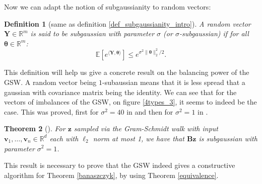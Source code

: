 \documentclass[12pt]{article}
\newtheorem{theorem}{Theorem}
\newtheorem{definition}[theorem]{Definition}
\begin{document}
Now we can adapt the notion of subgaussianity to random vectors:
\begin{definition}[same as definition \ref{def_subgaussianity_intro}]
A random vector $\textbf{Y} \in \mathbb{R}^m$ is said to be subgaussian with parameter $\sigma$ (or $\sigma$-subgaussian) if for all $\bm{\theta} \in \mathbb{R}^m$:
$$\mathbb{E}\left[e^{\langle\textbf{Y},\bm{\theta}\rangle}\right]\leq e^{\sigma^2\|\bm{\theta}\|_2^2/2}.$$
\end{definition}
This definition will help us give a concrete result on the balancing power of the GSW. A random vector being $1$-subaussian means that it is less spread that a gaussian with covariance matrix being the identity. We can see that for the vectors of imbalances of the GSW, on figure \ref{4types_3}, it seems to indeed be the case. This was proved, first for $\sigma^2=40$ in \cite{blues} and then for $\sigma^2=1$ in \cite{harshaw2019balancing}.
\begin{theorem}[\cite{harshaw2019balancing}]
    For $\textbf{z}$ sampled via the Gram-Schmidt walk with input $\textbf{v}_1, \dots, \textbf{v}_n \in \mathbb{R}^d$ each with $\ell_2$ norm at most 1, we have that $\textbf{Bz}$ is subgaussian with parameter $\sigma^2=1$.%
\end{theorem}
This result is necessary to prove that the GSW indeed gives a constructive algorithm for Theorem \ref{banaszczyk}, by using Theorem \ref{equivalence}.



\end{document}

